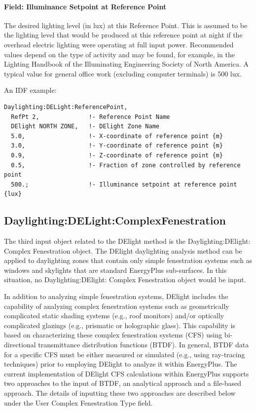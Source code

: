 \paragraph{Field: Illuminance Setpoint at Reference Point}\label{field-illuminance-setpoint-at-reference-point}

The desired lighting level (in lux) at this Reference Point. This is assumed to be the lighting level that would be produced at this reference point at night if the overhead electric lighting were operating at full input power. Recommended values depend on the type of activity and may be found, for example, in the Lighting Handbook of the Illuminating Engineering Society of North America. A typical value for general office work (excluding computer terminals) is 500 lux.

An IDF example:

\begin{lstlisting}
Daylighting:DELight:ReferencePoint,
  RefPt 2,              !- Reference Point Name
  DElight NORTH ZONE,   !- DElight Zone Name
  5.0,                  !- X-coordinate of reference point {m}
  3.0,                  !- Y-coordinate of reference point {m}
  0.9,                  !- Z-coordinate of reference point {m}
  0.5,                  !- Fraction of zone controlled by reference point
  500.;                 !- Illuminance setpoint at reference point {lux}
\end{lstlisting}

\subsection{Daylighting:DELight:ComplexFenestration}\label{daylightingdelightcomplexfenestration}

The third input object related to the DElight method is the Daylighting:DElight: Complex Fenestration object. The DElight daylighting analysis method can be applied to daylighting zones that contain only simple fenestration systems such as windows and skylights that are standard EnergyPlus sub-surfaces. In this situation, no Daylighting:DElight: Complex Fenestration object would be input.

In addition to analyzing simple fenestration systems, DElight includes the capability of analyzing complex fenestration systems such as geometrically complicated static shading systems (e.g., roof monitors) and/or optically complicated glazings (e.g., prismatic or holographic glass). This capability is based on characterizing these complex fenestration systems (CFS) using bi-directional transmittance distribution functions (BTDF). In general, BTDF data for a specific CFS must be either measured or simulated (e.g., using ray-tracing techniques) prior to employing DElight to analyze it within EnergyPlus. The current implementation of DElight CFS calculations within EnergyPlus supports two approaches to the input of BTDF, an analytical approach and a file-based approach. The details of inputting these two approaches are described below under the User Complex Fenestration Type field.

